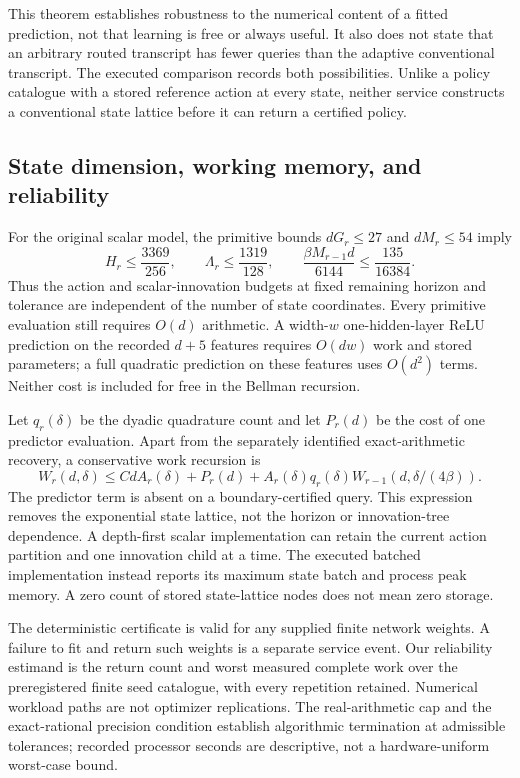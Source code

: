 This theorem establishes robustness to the numerical content of a fitted prediction, not that learning is free or always useful. It also does not state that an arbitrary routed transcript has fewer queries than the adaptive conventional transcript. The executed comparison records both possibilities. Unlike a policy catalogue with a stored reference action at every state, neither service constructs a conventional state lattice before it can return a certified policy.

\subsection{State dimension, working memory, and reliability}
For the original scalar model, the primitive bounds $dG_r\le27$ and $dM_r\le54$ imply
\[
 H_r\le\frac{3369}{256},\qquad
 \Lambda_r\le\frac{1319}{128},\qquad
 \frac{\beta M_{r-1}d}{6144}\le\frac{135}{16384}.
\]
Thus the action and scalar-innovation budgets at fixed remaining horizon and tolerance are independent of the number of state coordinates. Every primitive evaluation still requires $O(d)$ arithmetic. A width-$w$ one-hidden-layer ReLU prediction on the recorded $d+5$ features requires $O(dw)$ work and stored parameters; a full quadratic prediction on these features uses $O(d^2)$ terms. Neither cost is included for free in the Bellman recursion.

Let $q_r(\delta)$ be the dyadic quadrature count and let $P_r(d)$ be the cost of one predictor evaluation. Apart from the separately identified exact-arithmetic recovery, a conservative work recursion is
\[
 W_r(d,\delta)\le C d A_r(\delta)+P_r(d)
   +A_r(\delta)q_r(\delta)
      W_{r-1}(d,\delta/(4\beta)).
\]
The predictor term is absent on a boundary-certified query. This expression removes the exponential state lattice, not the horizon or innovation-tree dependence. A depth-first scalar implementation can retain the current action partition and one innovation child at a time. The executed batched implementation instead reports its maximum state batch and process peak memory. A zero count of stored state-lattice nodes does not mean zero storage.

The deterministic certificate is valid for any supplied finite network weights. A failure to fit and return such weights is a separate service event. Our reliability estimand is the return count and worst measured complete work over the preregistered finite seed catalogue, with every repetition retained. Numerical workload paths are not optimizer replications. The real-arithmetic cap and the exact-rational precision condition establish algorithmic termination at admissible tolerances; recorded processor seconds are descriptive, not a hardware-uniform worst-case bound.

